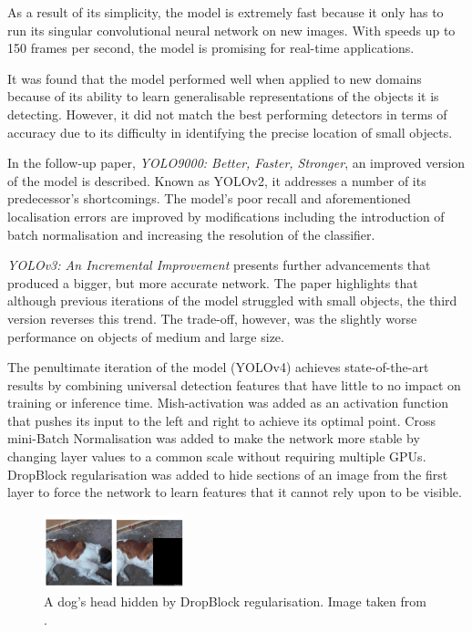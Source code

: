 \documentclass{thesis}
\begin{document}
As a result of its simplicity, the model is extremely fast because it only has to run its singular convolutional neural network on new images. With speeds up to 150 frames per second\cite{yolov1}, the model is promising for real-time applications.

It was found that the model performed well when applied to new domains because of its ability to learn generalisable representations of the objects it is detecting. However, it did not match the best performing detectors in terms of accuracy due to its difficulty in identifying the precise location of small objects.

In the follow-up paper, \textit{YOLO9000: Better, Faster, Stronger}, an improved version of the model is described. Known as YOLOv2, it addresses a number of its predecessor's shortcomings. The model's poor recall and aforementioned localisation errors are improved by modifications including the introduction of batch normalisation and increasing the resolution of the classifier\cite{yolo2}.

\textit{YOLOv3: An Incremental Improvement} presents further advancements that produced a bigger, but more accurate network. The paper highlights that although previous iterations of the model struggled with small objects, the third version reverses this trend. The trade-off, however, was the slightly worse performance on objects of medium and large size\cite{yolo3}.

The penultimate iteration of the model (YOLOv4) achieves state-of-the-art results by combining universal detection features that have little to no impact on training or inference time\cite{yolov4}. Mish-activation was added as an activation function that pushes its input to the left and right to achieve its optimal point. Cross mini-Batch Normalisation was added to make the network more stable by changing layer values to a common scale without requiring multiple GPUs. DropBlock regularisation was added to hide sections of an image from the first layer to force the network to learn features that it cannot rely upon to be visible.

\begin{figure}[h]
    \centering
    \includegraphics[scale=1]{images/dropblock.png}
    \caption{A dog's head hidden by DropBlock regularisation. Image taken from \cite{cutmix}.}
    \label{fig:dropblock}
\end{figure}
\end{document}
